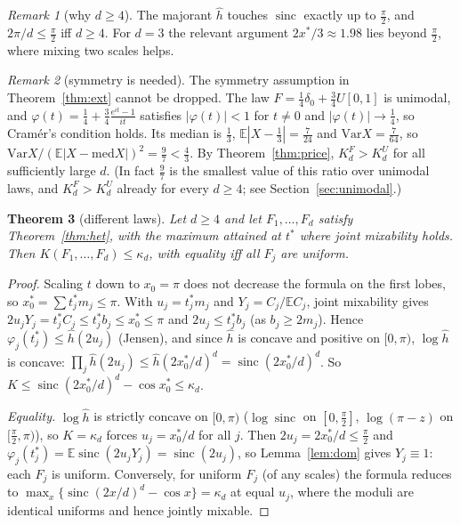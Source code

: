 \documentclass[11pt]{amsart}
\newtheorem{theorem}{Theorem}[section]\newtheorem{proposition}[theorem]{Proposition}\newtheorem{lemma}[theorem]{Lemma}
\theoremstyle{definition}\newtheorem{definition}[theorem]{Definition}\theoremstyle{remark}\newtheorem{remark}[theorem]{Remark}
\newcommand{\sinc}{\operatorname{sinc}}\newcommand{\E}{\mathbb E}\newcommand{\cx}{\le_{\mathrm{cx}}}
\begin{document}
\begin{remark}[why $d\ge4$]The majorant $\hat h$ touches $\sinc$ exactly up to $\frac\pi2$, and $2\pi/d\le\frac\pi2$ iff $d\ge4$. For $d=3$ the relevant argument $2x^*/3\approx1.98$
lies beyond $\frac\pi2$, where mixing two scales helps.\end{remark}
\begin{remark}[symmetry is needed]\label{rem:symneeded}
The symmetry assumption in Theorem~\ref{thm:ext} cannot be dropped. The law $F=\frac14\delta_0+\frac34U[0,1]$ is unimodal, and
$\varphi(t)=\frac14+\frac34\frac{e^{it}-1}{it}$ satisfies $|\varphi(t)|<1$ for $t\ne0$ and $|\varphi(t)|\to\frac14$, so Cram\'er's condition holds. Its median is $\frac13$,
$\E|X-\frac13|=\frac7{24}$ and $\mathrm{Var}X=\frac7{64}$, so $\mathrm{Var}X/(\E|X-\mathrm{med}X|)^2=\frac97<\frac43$. By Theorem~\ref{thm:price}, $K_d^F>K_d^U$ for all sufficiently
large $d$. (In fact $\frac97$ is the smallest value of this ratio over unimodal laws, and $K_d^F>K_d^U$ already for every $d\ge4$; see Section~\ref{sec:unimodal}.)
\end{remark}
\begin{theorem}[different laws]\label{thm:ext-het}
Let $d\ge4$ and let $F_1,\dots,F_d$ satisfy Theorem~\ref{thm:het}, with the maximum attained at $t^*$ where joint mixability holds. Then $K(F_1,\dots,F_d)\le\kappa_d$,
with equality iff all $F_j$ are uniform.
\end{theorem}
\begin{proof}Scaling $t$ down to $x_0=\pi$ does not decrease the formula on the first lobes, so $x_0^*=\sum t_j^*m_j\le\pi$. With $u_j=t_j^*m_j$ and $Y_j=C_j/\E C_j$, joint mixability gives
$2u_jY_j=t_j^*C_j\le t_j^*b_j\le x_0^*\le\pi$ and $2u_j\le t_j^*b_j$ (as $b_j\ge2m_j$). Hence $\varphi_j(t_j^*)\le\hat h(2u_j)$ (Jensen), and since $\hat h$ is concave and positive
on $[0,\pi)$, $\log\hat h$ is concave: $\prod_j\hat h(2u_j)\le\hat h(2x_0^*/d)^d=\sinc(2x_0^*/d)^d$. So $K\le\sinc(2x_0^*/d)^d-\cos x_0^*\le\kappa_d$.

\emph{Equality.} $\log\hat h$ is strictly concave on $[0,\pi)$ ($\log\sinc$ on $[0,\frac\pi2]$, $\log(\pi-z)$ on $[\frac\pi2,\pi)$), so $K=\kappa_d$ forces
$u_j=x_0^*/d$ for all $j$. Then $2u_j=2x_0^*/d\le\frac\pi2$ and $\varphi_j(t_j^*)=\E\sinc(2u_jY_j)=\sinc(2u_j)$, so Lemma~\ref{lem:dom} gives $Y_j\equiv1$: each $F_j$ is uniform.
Conversely, for uniform $F_j$ (of any scales) the formula reduces to $\max_x\{\sinc(2x/d)^d-\cos x\}=\kappa_d$ at equal $u_j$, where the moduli are identical uniforms and
hence jointly mixable.\end{proof}
\end{document}
